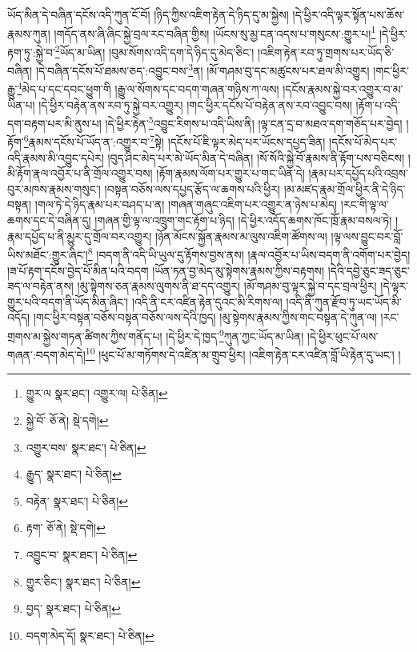 ཡོད་མིན་དེ་བཞིན་དངོས་འདི་ཀུན་ངོ་བོ། །ཉིད་ཀྱིས་འཇིག་རྟེན་དེ་ཉིད་དུ་མ་སྐྱེས། །དེ་ཕྱིར་འདི་ལྟར་སྟོན་པས་ཆོས་རྣམས་ཀུན། །གདོད་ནས་ཞི་ཞིང་སྐྱེ་བྲལ་རང་བཞིན་གྱིས། །ཡོངས་སུ་མྱ་ངན་འདས་པ་གསུངས་:གྱུར་པ།\footnote{གྱུར་ལ  སྣར་ཐང་། འགྱུར་ལ།  པེ་ཅིན། } །དེ་ཕྱིར་རྟག་ཏུ་:སྐྱེ་བ་\footnote{སྐྱེ་བོ་  ཅོ་ནེ།  སྡེ་དགེ། }ཡོད་མ་ཡིན། །བུམ་སོགས་འདི་དག་དེ་ཉིད་དུ་མེད་ཅིང་། །འཇིག་རྟེན་རབ་ཏུ་གྲགས་པར་ཡོད་ཅི་བཞིན། །དེ་བཞིན་དངོས་པོ་ཐམས་ཅད་:འབྱུང་བས་\footnote{འགྱུར་བས་  སྣར་ཐང་།  པེ་ཅིན། }ན། །མོ་གཤམ་བུ་དང་མཚུངས་པར་ཐལ་མི་འགྱུར། །གང་ཕྱིར་རྒྱུ་\footnote{རྒྱུད་  སྣར་ཐང་།  པེ་ཅིན། }མེད་པ་དང་དབང་ཕྱུག་གི །རྒྱུ་ལ་སོགས་དང་བདག་གཞན་གཉིས་ཀ་ལས། །དངོས་རྣམས་སྐྱེ་བར་འགྱུར་བ་མ་ཡིན་པ། །དེ་ཕྱིར་བརྟེན་ནས་རབ་ཏུ་སྐྱེ་བར་འགྱུར། །གང་ཕྱིར་དངོས་པོ་བརྟེན་ནས་རབ་འབྱུང་བས། །རྟོག་པ་འདི་དག་བརྟག་པར་མི་ནུས་པ། །དེ་ཕྱིར་རྟེན་\footnote{བརྟེན་  སྣར་ཐང་།  པེ་ཅིན། }འབྱུང་རིགས་པ་འདི་ཡིས་ནི། །ལྟ་ངན་དྲ་བ་མཐའ་དག་གཅོད་པར་བྱེད། །རྟོག་\footnote{རྟག་  ཅོ་ནེ།  སྡེ་དགེ། }རྣམས་དངོས་པོ་ཡོད་ན་:འགྱུར་བ་\footnote{འབྱུང་བ་  སྣར་ཐང་།  པེ་ཅིན། }སྟེ། །དངོས་པོ་ཇི་ལྟར་མེད་པར་ཡོངས་དཔྱད་ཟིན། །དངོས་པོ་མེད་པར་འདི་རྣམས་མི་འབྱུང་དཔེར། །བུད་ཤིང་མེད་པར་མེ་ཡོད་མིན་དེ་བཞིན། །སོ་སོའི་སྐྱེ་བོ་རྣམས་ནི་རྟོག་པས་བཅིངས། །མི་རྟོག་རྣལ་འབྱོར་པ་ནི་གྲོལ་འགྱུར་བས། །རྟོག་རྣམས་ལོག་པར་གྱུར་པ་གང་ཡིན་དེ། །རྣམ་པར་དཔྱོད་པའི་འབྲས་བུར་མཁས་རྣམས་གསུང་། །བསྟན་བཅོས་ལས་དཔྱད་རྩོད་ལ་ཆགས་པའི་ཕྱིར། །མ་མཛད་རྣམ་གྲོལ་ཕྱིར་ནི་དེ་ཉིད་བསྟན། །གལ་ཏེ་དེ་ཉིད་རྣམ་པར་བཤད་པ་ན། །གཞན་གཞུང་འཇིག་པར་འགྱུར་ན་ཉེས་པ་མེད། །རང་གི་ལྟ་ལ་ཆགས་དང་དེ་བཞིན་དུ། །གཞན་གྱི་ལྟ་ལ་འཁྲུག་གང་རྟོག་པ་ཉིད། །དེ་ཕྱིར་འདོད་ཆགས་ཁོང་ཁྲོ་རྣམ་བསལ་ཏེ། །རྣམ་དཔྱོད་པ་ནི་མྱུར་དུ་གྲོལ་བར་འགྱུར། །ཉོན་མོངས་སྐྱོན་རྣམས་མ་ལུས་འཇིག་ཚོགས་ལ། །ལྟ་ལས་བྱུང་བར་བློ་ཡིས་མཐོང་:གྱུར་ཞིང་།\footnote{གྱུར་ཅིང་།  སྣར་ཐང་།  པེ་ཅིན། } །བདག་ནི་འདི་ཡི་ཡུལ་དུ་རྟོགས་བྱས་ནས། །རྣལ་འབྱོར་པ་ཡིས་བདག་ནི་འགོག་པར་བྱེད། །ཟ་པོ་རྟག་དངོས་བྱེད་པོ་མིན་པའི་བདག །ཡོན་ཏན་བྱ་མེད་མུ་སྟེགས་རྣམས་ཀྱིས་བརྟགས། །དེའི་དབྱེ་ཅུང་ཟད་ཅུང་ཟད་ལ་བརྟེན་ནས། །མུ་སྟེགས་ཅན་རྣམས་ལུགས་ནི་ཐ་དད་འགྱུར། །མོ་གཤམ་བུ་ལྟར་སྐྱེ་བ་དང་བྲལ་ཕྱིར། །དེ་ལྟར་གྱུར་པའི་བདག་ནི་ཡོད་མིན་ཞིང་། །འདི་ནི་ངར་འཛིན་རྟེན་དུའང་མི་རིགས་ལ། །འདི་ནི་ཀུན་རྫོབ་ཏུ་ཡང་ཡོད་མི་འདོད། །གང་ཕྱིར་བསྟན་བཅོས་བསྟན་བཅོས་ལས་དེའི་ཁྱད། །མུ་སྟེགས་རྣམས་ཀྱིས་གང་བསྟན་དེ་ཀུན་ལ། །རང་གྲགས་མ་སྐྱེས་གཏན་ཚིགས་ཀྱིས་གནོད་པ། །དེ་ཕྱིར་དེ་ཁྱད་\footnote{བྱད་  སྣར་ཐང་།  པེ་ཅིན། }ཀུན་ཀྱང་ཡོད་མ་ཡིན། །དེ་ཕྱིར་ཕུང་པོ་ལས་གཞན་:བདག་མེད་དེ།\footnote{བདག་མེད་དོ།  སྣར་ཐང་།  པེ་ཅིན། } །ཕུང་པོ་མ་གཏོགས་དེ་འཛིན་མ་གྲུབ་ཕྱིར། །འཇིག་རྟེན་ངར་འཛིན་བློ་ཡི་རྟེན་དུ་ཡང་། །
